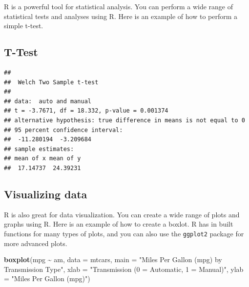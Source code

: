 \documentclass[
]{book}
\newenvironment{Shaded}{\begin{snugshade}}{\end{snugshade}}
\newcommand{\AttributeTok}[1]{\textcolor[rgb]{0.13,0.29,0.53}{#1}}
\newcommand{\CommentTok}[1]{\textcolor[rgb]{0.56,0.35,0.01}{\textit{#1}}}
\newcommand{\DecValTok}[1]{\textcolor[rgb]{0.00,0.00,0.81}{#1}}
\newcommand{\FunctionTok}[1]{\textcolor[rgb]{0.13,0.29,0.53}{\textbf{#1}}}
\newcommand{\NormalTok}[1]{#1}
\newcommand{\OtherTok}[1]{\textcolor[rgb]{0.56,0.35,0.01}{#1}}
\newcommand{\SpecialCharTok}[1]{\textcolor[rgb]{0.81,0.36,0.00}{\textbf{#1}}}
\newcommand{\StringTok}[1]{\textcolor[rgb]{0.31,0.60,0.02}{#1}}
\begin{document}
R is a powerful tool for statistical analysis. You can perform a wide range of statistical tests and analyses using R. Here is an example of how to perform a simple t-test.

\subsection{T-Test}\label{t-test}

\begin{Shaded}
\end{Shaded}

\begin{verbatim}
## 
##  Welch Two Sample t-test
## 
## data:  auto and manual
## t = -3.7671, df = 18.332, p-value = 0.001374
## alternative hypothesis: true difference in means is not equal to 0
## 95 percent confidence interval:
##  -11.280194  -3.209684
## sample estimates:
## mean of x mean of y 
##  17.14737  24.39231
\end{verbatim}

\subsection{Visualizing data}\label{visualizing-data}

R is also great for data visualization. You can create a wide range of plots and graphs using R. Here is an example of how to create a boxlot. R has in built functions for many types of plots, and you can also use the \texttt{ggplot2} package for more advanced plots.

\begin{Shaded}
\begin{Highlighting}[]
\FunctionTok{boxplot}\NormalTok{(mpg }\SpecialCharTok{\textasciitilde{}}\NormalTok{ am, }\AttributeTok{data =}\NormalTok{ mtcars,}
        \AttributeTok{main =} \StringTok{"Miles Per Gallon (mpg) by Transmission Type"}\NormalTok{,}
        \AttributeTok{xlab =} \StringTok{"Transmission (0 = Automatic, 1 = Manual)"}\NormalTok{,}
        \AttributeTok{ylab =} \StringTok{"Miles Per Gallon (mpg)"}\NormalTok{)}
\end{Highlighting}
\end{Shaded}
\end{document}
